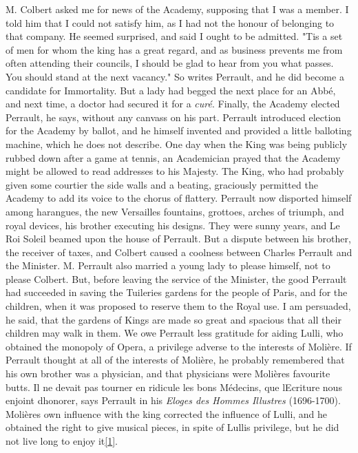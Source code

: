 \documentclass[14pt,a4paper]{memoir}
\begin{document}
\textquotesingle M. Colbert asked me for news of the Academy, supposing
that I was a member. I told him that I could not satisfy him, as I had
not the honour of belonging to that company. He seemed surprised, and
said I ought to be admitted. "\textquotesingle Tis a set of men for whom
the king has a great regard, and as business prevents me from often
attending their councils, I should be glad to hear from you what passes.
You should stand at the next vacancy."\textquotesingle{} So writes
Perrault, and he did become a candidate for Immortality. But a lady had
begged the next place for an Abbé, and next time, a doctor had secured
it for a \emph{curé}. Finally, the Academy elected Perrault, he says,
without any canvass on his part. Perrault introduced election for the
Academy by ballot, and he himself invented and provided a little
balloting machine, which he does not describe. One day when the King was
being publicly rubbed down after a game at tennis, an Academician prayed
that the Academy might be allowed to read addresses to his Majesty. The
King, who had probably given some courtier the side walls and a beating,
graciously permitted the Academy to add its voice to the chorus of
flattery. Perrault now disported himself among harangues, the new
Versailles fountains, grottoes, arches of triumph, and royal devices,
his brother executing his designs. They were sunny years, and Le Roi
Soleil beamed upon the house of Perrault. But a dispute between his
brother, the receiver of taxes, and Colbert caused a coolness between
Charles Perrault and the Minister. M. Perrault also married a young lady
to please himself, not to please Colbert. But, before leaving the
service of the Minister, the good Perrault had succeeded in saving the
Tuileries gardens for the people of Paris, and for the children, when it
was proposed to reserve them to the Royal use. \textquotesingle I am
persuaded,\textquotesingle{} he said, \textquotesingle that the gardens
of Kings are made so great and spacious that all their children may walk
in them.\textquotesingle{} We owe Perrault less gratitude for aiding
Lulli, who obtained the monopoly of Opera, a privilege adverse to the
interests of Molière. If Perrault thought at all of the interests of
Molière, he probably remembered that his own brother was a physician,
and that physicians were Molière\textquotesingle s favourite butts.
\textquotesingle Il ne devait pas tourner en ridicule les bons Médecins,
que l\textquotesingle Ecriture nous enjoint
d\textquotesingle honorer,\textquotesingle{} says Perrault in his
\emph{Eloges des Hommes Illustres} (1696-1700).
Molière\textquotesingle s own influence with the king corrected the
influence of Lulli, and he obtained the right to give musical pieces, in
spite of Lulli\textquotesingle s privilege, but he did not live long to
enjoy
it\protect\hypertarget{4533318093929944247_33931-h-0.htm.xhtmlux5cux23FNanchor_1}{}{}\protect\hyperlink{4533318093929944247_33931-h-0.htm.xhtmlux5cux23Footnote_1}{{{[}1{]}}}.
\end{document}
